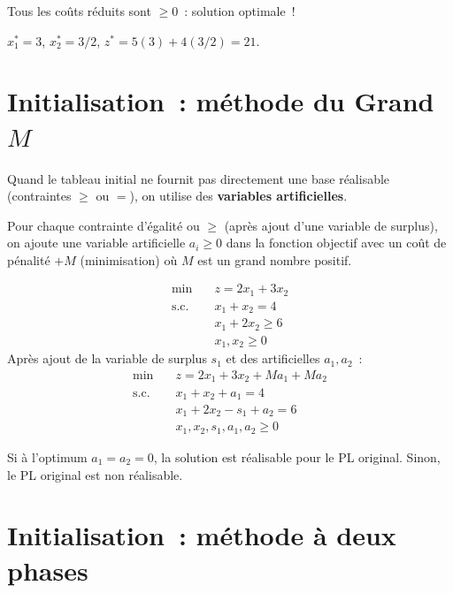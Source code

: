 \begin{exemple}
Tous les co\^uts r\'eduits sont $\ge 0$~: solution optimale~!

$x_1^* = 3$, $x_2^* = 3/2$, $z^* = 5(3) + 4(3/2) = 21$.
\end{exemple}

\section{Initialisation~: m\'ethode du Grand $M$}

Quand le tableau initial ne fournit pas directement une base r\'ealisable
(contraintes $\ge$ ou $=$), on utilise des \textbf{variables artificielles}.

\begin{definition}
Pour chaque contrainte d'\'egalit\'e ou $\ge$ (apr\`es ajout d'une variable de
surplus), on ajoute une variable artificielle $a_i \ge 0$ dans la fonction
objectif avec un co\^ut de p\'enalit\'e $+M$ (minimisation) o\`u $M$ est un grand
nombre positif.
\end{definition}

\begin{exemple}[Grand $M$]
\[
\begin{aligned}
  \min \quad & z = 2x_1 + 3x_2 \\
  \text{s.c.} \quad
    & x_1 + x_2 = 4 \\
    & x_1 + 2x_2 \ge 6 \\
    & x_1, x_2 \ge 0
\end{aligned}
\]
Apr\`es ajout de la variable de surplus $s_1$ et des artificielles $a_1, a_2$~:
\[
\begin{aligned}
  \min \quad & z = 2x_1 + 3x_2 + Ma_1 + Ma_2 \\
  \text{s.c.} \quad
    & x_1 + x_2 + a_1 = 4 \\
    & x_1 + 2x_2 - s_1 + a_2 = 6 \\
    & x_1, x_2, s_1, a_1, a_2 \ge 0
\end{aligned}
\]

Si \`a l'optimum $a_1 = a_2 = 0$, la solution est r\'ealisable pour le PL
original.  Sinon, le PL original est non r\'ealisable.
\end{exemple}

\section{Initialisation~: m\'ethode \`a deux phases}

